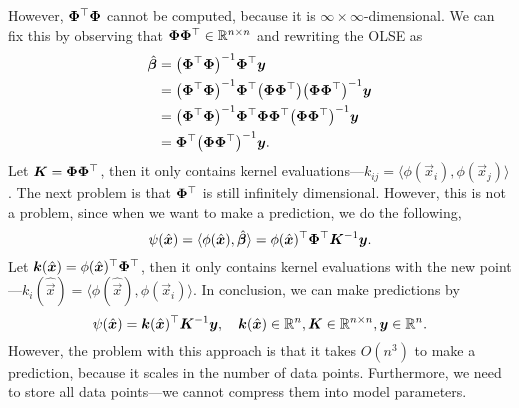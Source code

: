 However, $\bm{\Phi}^\top \bm{\Phi}$ cannot be computed, because it is $\infty \times
    \infty$-dimensional. We can fix this by observing that $\bm{\Phi} \bm{\Phi}^\top \in \mathbb{R}^{n
        \times n}$ and rewriting the OLSE as
\begin{align*}
    \hat{\vec{\beta}} & = \inv{\lft( \transpose{\mat{\Phi}} \mat{\Phi} \rgt)} \transpose{\mat{\Phi}} \vec{y}                                                                                                   \\
                      & = \inv{\lft( \transpose{\mat{\Phi}} \mat{\Phi} \rgt)} \transpose{\mat{\Phi}} \lft( \mat{\Phi} \transpose{\mat{\Phi}} \rgt) \inv{\lft( \mat{\Phi} \transpose{\mat{\Phi}} \rgt)} \vec{y} \\
                      & = \inv{\lft( \transpose{\mat{\Phi}} \mat{\Phi} \rgt)} \transpose{\mat{\Phi}} \mat{\Phi} \transpose{\mat{\Phi}} \inv{\lft( \mat{\Phi} \transpose{\mat{\Phi}} \rgt)} \vec{y}             \\
                      & = \transpose{\mat{\Phi}} \inv{\lft( \mat{\Phi} \transpose{\mat{\Phi}} \rgt)} \vec{y}.
\end{align*}
Let $\bm{K} = \bm{\Phi} \bm{\Phi}^\top$, then it only contains kernel
evaluations---$k_{ij} = \langle \phi(\vec{x}_i), \phi(\vec{x}_j) \rangle$. The next problem is that
$\bm{\Phi}^\top$ is still infinitely dimensional. However, this is not a problem, since when we
want to make a prediction, we do the following, \[
    \psi(\hat{\bm{x}}) = \langle \phi(\hat{\bm{x}}), \hat{\bm{\beta}} \rangle = \phi(\hat{\bm{x}})^\top \bm{\Phi}^\top \bm{K}^{-1} \bm{y}.
\]
Let $\bm{k}(\hat{\bm{x}}) = \phi(\hat{\bm{x}})^\top \bm{\Phi}^\top$, then it only
contains kernel evaluations with the new point---$k_i(\hat{\vec{x}}) = \langle \phi(\hat{\vec{x}}),
    \phi(\vec{x}_i) \rangle$. In conclusion, we can make predictions by \[
    \psi(\hat{\bm{x}}) = \bm{k}(\hat{\bm{x}})^\top \bm{K}^{-1} \bm{y}, \quad \bm{k}(\hat{\bm{x}}) \in \mathbb{R}^n, \bm{K} \in \mathbb{R}^{n \times n}, \bm{y} \in \mathbb{R}^n.
\]
However, the problem with this approach is that it takes $O(n^3)$ to make a prediction, because it
scales in the number of data points. Furthermore, we need to store all data points---we cannot
compress them into model parameters.
